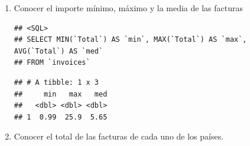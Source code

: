 \documentclass[]{book}
\newenvironment{Shaded}{\begin{snugshade}}{\end{snugshade}}
\newcommand{\DataTypeTok}[1]{\textcolor[rgb]{0.13,0.29,0.53}{#1}}
\newcommand{\KeywordTok}[1]{\textcolor[rgb]{0.13,0.29,0.53}{\textbf{#1}}}
\newcommand{\NormalTok}[1]{#1}
\newcommand{\OperatorTok}[1]{\textcolor[rgb]{0.81,0.36,0.00}{\textbf{#1}}}
\newcommand{\OtherTok}[1]{\textcolor[rgb]{0.56,0.35,0.01}{#1}}
\newcommand{\StringTok}[1]{\textcolor[rgb]{0.31,0.60,0.02}{#1}}
\begin{document}
\begin{enumerate}
\def\labelenumi{\arabic{enumi}.}
\item
  Conocer el importe mínimo, máximo y la media de las facturas

\begin{Shaded}
\end{Shaded}

\begin{verbatim}
## <SQL>
## SELECT MIN(`Total`) AS `min`, MAX(`Total`) AS `max`, AVG(`Total`) AS `med`
## FROM `invoices`
\end{verbatim}

\begin{Shaded}
\end{Shaded}

\begin{verbatim}
## # A tibble: 1 x 3
##     min   max   med
##   <dbl> <dbl> <dbl>
## 1  0.99  25.9  5.65
\end{verbatim}
\item
  Conocer el total de las facturas de cada uno de los países.

\begin{Shaded}
\end{Shaded}


\end{enumerate}
\end{document}
